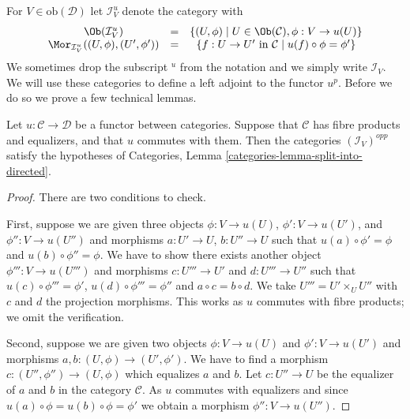 \medskip\noindent
For $V \in \text{ob}(\mathcal{D})$ let $\mathcal{I}^u_V$
denote the category with
\begin{equation}
\label{equation-colim-category}
\begin{matrix}
\Ob(\mathcal{I}^u_V)
&
=
&
\{
(U, \phi)
\mid
U \in \Ob(\mathcal{C}),
\phi : V \to u(U)
\}
\\
\Mor_{\mathcal{I}^u_V}((U, \phi), (U', \phi'))
&
=
&
\{
f : U \to U' \text{ in }\mathcal{C}
\mid
u(f) \circ \phi = \phi'
\}
\end{matrix}
\end{equation}
We sometimes drop the subscript ${}^u$ from the notation and we simply write
$\mathcal{I}_V$.
We will use these categories to define a left adjoint to the functor $u^p$.
Before we do so we prove a few technical lemmas.

\begin{lemma}
\label{lemma-almost-directed}
Let $u : \mathcal{C} \to \mathcal{D}$ be a functor between categories.
Suppose that $\mathcal{C}$ has fibre products and equalizers, and that
$u$ commutes with them. Then the categories $(\mathcal{I}_V)^{opp}$
satisfy the hypotheses of
Categories, Lemma \ref{categories-lemma-split-into-directed}.
\end{lemma}

\begin{proof}
There are two conditions to check.

\medskip\noindent
First, suppose we are given three objects
$\phi : V \to u(U)$, $\phi' : V \to u(U')$, and $\phi'' : V \to u(U'')$
and morphisms $a : U' \to U$, $b : U'' \to U$ such that
$u(a) \circ \phi' = \phi$ and $u(b) \circ \phi'' = \phi$.
We have to show there exists another object $\phi''' : V \to u(U''')$
and morphisms $c : U''' \to U'$ and $d : U''' \to U''$ such that
$u(c) \circ \phi''' = \phi'$, $u(d) \circ \phi''' = \phi''$ and
$a \circ c = b \circ d$. We take $U''' = U' \times_U U''$
with $c$ and $d$ the projection morphisms. This works as $u$ commutes
with fibre products; we omit the verification.

\medskip\noindent
Second, suppose we are given two objects
$\phi : V \to u(U)$ and $\phi' : V \to u(U')$
and morphisms $a, b : (U, \phi) \to (U', \phi')$.
We have to find a morphism $c : (U'', \phi'') \to (U, \phi)$
which equalizes $a$ and $b$. Let $c : U'' \to U$ be the equalizer of
$a$ and $b$ in the category $\mathcal{C}$. As $u$ commutes
with equalizers and since $u(a) \circ \phi = u(b) \circ \phi = \phi'$
we obtain a morphism $\phi'' : V \to u(U'')$.
\end{proof}

